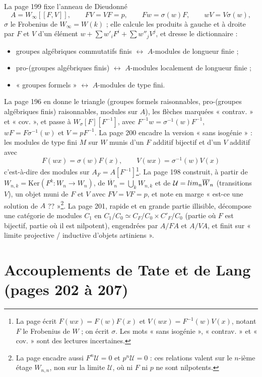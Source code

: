 \documentclass[11pt,a4paper]{article}
\begin{document}
La page 199 fixe l'anneau de Dieudonné
\[
A = W_\infty[[F, V]],\qquad FV = VF = p,\qquad Fw = \sigma(w)F,\qquad wV = V\sigma(w),
\]
$\sigma$ le Frobenius de $W_\infty = W(k)$ ; elle calcule les produits à gauche et à
droite par $F$ et $V$ d'un élément $w + \sum w'_i F^i + \sum w''_j V^j$, et dresse le
dictionnaire :
\begin{itemize}
\item groupes algébriques commutatifs finis $\leftrightarrow$ $A$-modules de longueur
finie ;
\item pro-(groupes algébriques finis) $\leftrightarrow$ $A$-modules localement de
longueur finie ;
\item « groupes formels » $\leftrightarrow$ $A$-modules de type fini.
\end{itemize}
La page 196 en donne le triangle (groupes formels raisonnables, pro-(groupes
algébriques finis) raisonnables, modules sur $A$), les flèches marquées
« contrav. » et « cov. », et passe à $W_\sigma[F][F^{-1}]$, avec $F^{-1}w =
\sigma^{-1}(w)F^{-1}$, $wF = F\sigma^{-1}(w)$ et $V = pF^{-1}$. La page 200 encadre la
version « sans isogénie » : les modules de type fini $M$ sur $W$ munis d'un $F$
additif bijectif et d'un $V$ additif avec
\[
F(wx) = \sigma(w)F(x),\qquad V(wx) = \sigma^{-1}(w)V(x)
\]
c'est-à-dire des modules sur $A_F = A[F^{-1}]$\footnote{La page écrit $F(wx) = F(w)F(x)$ et
$V(wx) = F^{-1}(w)V(x)$, notant $F$ le Frobenius de $W$ ; on écrit $\sigma$. Les
mots « sans isogénie », « contrav. » et « cov. » sont des lectures incertaines.}.
La page 198 construit, à partir de $W_{n,k} = \mathrm{Ker}(F^k : W_n \to W_n)$, de
$\overline{W}_n = \bigcup_k W_{n,k}$ et de $\mathcal{U} = \varinjlim_n \overline{W}_n$
(transitions $V$), un objet muni de $F$ et $V$ avec $FV = VF = p$, et note en marge
« est-ce une solution de $A$ ?? »\footnote{La page encadre aussi $F^n\mathcal{U} = 0$
et $p^n\mathcal{U} = 0$ : ces relations valent sur le $n$-ième étage
$W_{n,n}$, non sur la limite $\mathcal{U}$, où ni $F$ ni $p$ ne sont nilpotents.}.
La page 201, rapide et en grande partie illisible, décompose une catégorie de
modules $C_1$ en $C_1/C_0 \simeq C_F/C_0 \times C'_F/C_0$ (partie où $F$ est
bijectif, partie où il est nilpotent), engendrées par $A/FA$ et $A/VA$, et finit
sur « limite projective / inductive d'objets artiniens ».

\section*{Accouplements de Tate et de Lang (pages 202 à 207)}
\end{document}
